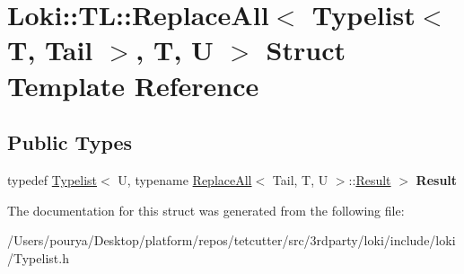 \hypertarget{structLoki_1_1TL_1_1ReplaceAll_3_01Typelist_3_01T_00_01Tail_01_4_00_01T_00_01U_01_4}{}\section{Loki\+:\+:T\+L\+:\+:Replace\+All$<$ Typelist$<$ T, Tail $>$, T, U $>$ Struct Template Reference}
\label{structLoki_1_1TL_1_1ReplaceAll_3_01Typelist_3_01T_00_01Tail_01_4_00_01T_00_01U_01_4}
\subsection*{Public Types}
\begin{DoxyCompactItemize}
\item 
\hypertarget{structLoki_1_1TL_1_1ReplaceAll_3_01Typelist_3_01T_00_01Tail_01_4_00_01T_00_01U_01_4_aa6bbd301b5f5d8b2b644b2ee36909d63}{}typedef \hyperlink{structLoki_1_1Typelist}{Typelist}$<$ U, typename \hyperlink{structLoki_1_1TL_1_1ReplaceAll}{Replace\+All}$<$ Tail, T, U $>$\+::\hyperlink{structLoki_1_1Typelist}{Result} $>$ {\bfseries Result}\label{structLoki_1_1TL_1_1ReplaceAll_3_01Typelist_3_01T_00_01Tail_01_4_00_01T_00_01U_01_4_aa6bbd301b5f5d8b2b644b2ee36909d63}

\end{DoxyCompactItemize}


The documentation for this struct was generated from the following file\+:\begin{DoxyCompactItemize}
\item 
/\+Users/pourya/\+Desktop/platform/repos/tetcutter/src/3rdparty/loki/include/loki/Typelist.\+h\end{DoxyCompactItemize}
